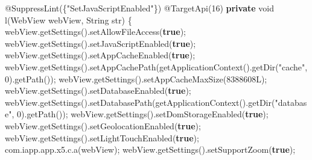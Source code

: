 \documentclass[
]{article}
\newenvironment{Shaded}{}{}
\newcommand{\AttributeTok}[1]{\textcolor[rgb]{0.49,0.56,0.16}{#1}}
\newcommand{\BuiltInTok}[1]{\textcolor[rgb]{0.00,0.50,0.00}{#1}}
\newcommand{\DataTypeTok}[1]{\textcolor[rgb]{0.56,0.13,0.00}{#1}}
\newcommand{\DecValTok}[1]{\textcolor[rgb]{0.25,0.63,0.44}{#1}}
\newcommand{\FunctionTok}[1]{\textcolor[rgb]{0.02,0.16,0.49}{#1}}
\newcommand{\KeywordTok}[1]{\textcolor[rgb]{0.00,0.44,0.13}{\textbf{#1}}}
\newcommand{\NormalTok}[1]{#1}
\newcommand{\OperatorTok}[1]{\textcolor[rgb]{0.40,0.40,0.40}{#1}}
\newcommand{\StringTok}[1]{\textcolor[rgb]{0.25,0.44,0.63}{#1}}
\begin{document}
\begin{Shaded}
\begin{Highlighting}[]
    \AttributeTok{@SuppressLint}\OperatorTok{(\{}\StringTok{"SetJavaScriptEnabled"}\OperatorTok{\})}
    \AttributeTok{@TargetApi}\OperatorTok{(}\DecValTok{16}\OperatorTok{)}
    \KeywordTok{private} \DataTypeTok{void} \FunctionTok{l}\OperatorTok{(}\NormalTok{WebView webView}\OperatorTok{,} \BuiltInTok{String}\NormalTok{ str}\OperatorTok{)} \OperatorTok{\{}
\NormalTok{        webView}\OperatorTok{.}\FunctionTok{getSettings}\OperatorTok{().}\FunctionTok{setAllowFileAccess}\OperatorTok{(}\KeywordTok{true}\OperatorTok{);}
\NormalTok{        webView}\OperatorTok{.}\FunctionTok{getSettings}\OperatorTok{().}\FunctionTok{setJavaScriptEnabled}\OperatorTok{(}\KeywordTok{true}\OperatorTok{);}
\NormalTok{        webView}\OperatorTok{.}\FunctionTok{getSettings}\OperatorTok{().}\FunctionTok{setAppCacheEnabled}\OperatorTok{(}\KeywordTok{true}\OperatorTok{);}
\NormalTok{        webView}\OperatorTok{.}\FunctionTok{getSettings}\OperatorTok{().}\FunctionTok{setAppCachePath}\OperatorTok{(}\FunctionTok{getApplicationContext}\OperatorTok{().}\FunctionTok{getDir}\OperatorTok{(}\StringTok{"cache"}\OperatorTok{,} \DecValTok{0}\OperatorTok{).}\FunctionTok{getPath}\OperatorTok{());}
\NormalTok{        webView}\OperatorTok{.}\FunctionTok{getSettings}\OperatorTok{().}\FunctionTok{setAppCacheMaxSize}\OperatorTok{(}\DecValTok{8388608L}\OperatorTok{);}
\NormalTok{        webView}\OperatorTok{.}\FunctionTok{getSettings}\OperatorTok{().}\FunctionTok{setDatabaseEnabled}\OperatorTok{(}\KeywordTok{true}\OperatorTok{);}
\NormalTok{        webView}\OperatorTok{.}\FunctionTok{getSettings}\OperatorTok{().}\FunctionTok{setDatabasePath}\OperatorTok{(}\FunctionTok{getApplicationContext}\OperatorTok{().}\FunctionTok{getDir}\OperatorTok{(}\StringTok{"database"}\OperatorTok{,} \DecValTok{0}\OperatorTok{).}\FunctionTok{getPath}\OperatorTok{());}
\NormalTok{        webView}\OperatorTok{.}\FunctionTok{getSettings}\OperatorTok{().}\FunctionTok{setDomStorageEnabled}\OperatorTok{(}\KeywordTok{true}\OperatorTok{);}
\NormalTok{        webView}\OperatorTok{.}\FunctionTok{getSettings}\OperatorTok{().}\FunctionTok{setGeolocationEnabled}\OperatorTok{(}\KeywordTok{true}\OperatorTok{);}
\NormalTok{        webView}\OperatorTok{.}\FunctionTok{getSettings}\OperatorTok{().}\FunctionTok{setLightTouchEnabled}\OperatorTok{(}\KeywordTok{true}\OperatorTok{);}
\NormalTok{        com}\OperatorTok{.}\FunctionTok{iapp}\OperatorTok{.}\FunctionTok{app}\OperatorTok{.}\FunctionTok{x5}\OperatorTok{.}\FunctionTok{c}\OperatorTok{.}\FunctionTok{a}\OperatorTok{(}\NormalTok{webView}\OperatorTok{);}
\NormalTok{        webView}\OperatorTok{.}\FunctionTok{getSettings}\OperatorTok{().}\FunctionTok{setSupportZoom}\OperatorTok{(}\KeywordTok{true}\OperatorTok{);}

\end{Highlighting}
\end{Shaded}
\end{document}
